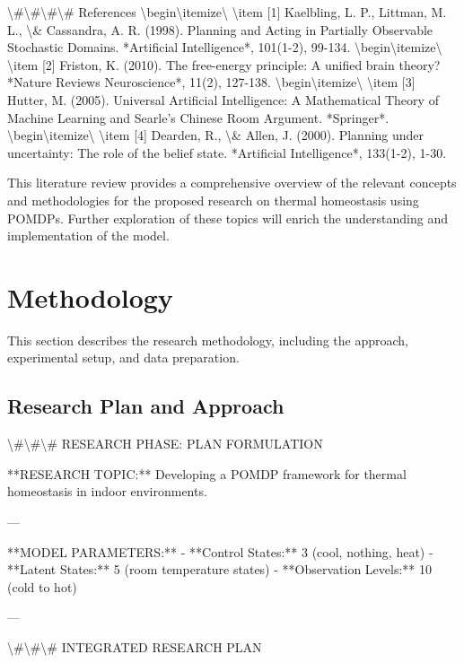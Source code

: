 \documentclass[11pt,a4paper]{article}
\begin{document}
\textbackslash{}#\textbackslash{}#\textbackslash{}#\textbackslash{}# References
\textbackslash{}begin\textbackslash{}{itemize\textbackslash{}}
\textbackslash{}item [1] Kaelbling, L. P., Littman, M. L., \textbackslash{}& Cassandra, A. R. (1998). Planning and Acting in Partially Observable Stochastic Domains. *Artificial Intelligence*, 101(1-2), 99-134.
\textbackslash{}begin\textbackslash{}{itemize\textbackslash{}}
\textbackslash{}item [2] Friston, K. (2010). The free-energy principle: A unified brain theory? *Nature Reviews Neuroscience*, 11(2), 127-138.
\textbackslash{}begin\textbackslash{}{itemize\textbackslash{}}
\textbackslash{}item [3] Hutter, M. (2005). Universal Artificial Intelligence: A Mathematical Theory of Machine Learning and Searle's Chinese Room Argument. *Springer*.
\textbackslash{}begin\textbackslash{}{itemize\textbackslash{}}
\textbackslash{}item [4] Dearden, R., \textbackslash{}& Allen, J. (2000). Planning under uncertainty: The role of the belief state. *Artificial Intelligence*, 133(1-2), 1-30.

This literature review provides a comprehensive overview of the relevant concepts and methodologies for the proposed research on thermal homeostasis using POMDPs. Further exploration of these topics will enrich the understanding and implementation of the model.
\section{Methodology}

This section describes the research methodology, including the approach, experimental setup, and data preparation.


\subsection{Research Plan and Approach}

\textbackslash{}#\textbackslash{}#\textbackslash{}# RESEARCH PHASE: PLAN FORMULATION

**RESEARCH TOPIC:**  
Developing a POMDP framework for thermal homeostasis in indoor environments.

---

**MODEL PARAMETERS:**
- **Control States:** 3 (cool, nothing, heat)
- **Latent States:** 5 (room temperature states)
- **Observation Levels:** 10 (cold to hot)

---

\textbackslash{}#\textbackslash{}#\textbackslash{}# INTEGRATED RESEARCH PLAN
\end{document}

